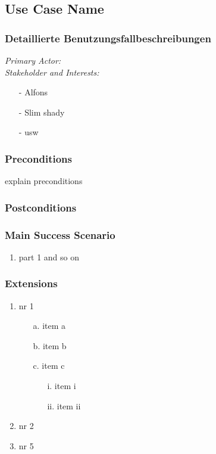 \documentclass[./detailed_overview_usecases.tex]{subfiles}
\begin{document}
    \subsection{Use Case Name}
    \subsubsection{Detaillierte Benutzungsfallbeschreibungen}

    \textit{Primary Actor:}
    \\
    \textit{Stakeholder and Interests:}
    \begin{itemize}
        \item[-] Alfons
        \item[-] Slim shady
        \item[-] usw
    \end{itemize}

    \subsubsection*{Preconditions}
    explain preconditions

    \subsubsection*{Postconditions}

    \subsubsection*{Main Success Scenario}
    \begin{enumerate}
        \item part 1 and so on
    \end{enumerate}

    \subsubsection*{Extensions}
    \begin{enumerate}
        \item nr 1 \begin{itemize}
                       \item[a.] item a
                       \item[b.] item b
                       \item[c.] item c
                                \begin{itemize}
                                     \item[i.] item i
                                     \item[ii.] item ii
                                \end{itemize}
                    \end{itemize}
        \item nr 2
        \setcounter{enumi}{4}
        \item nr 5
    \end{enumerate}
\end{document}
